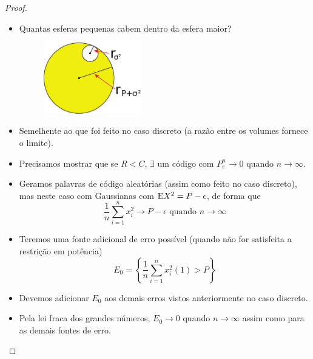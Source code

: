 \begin{frame}[allowframebreaks]
\begin{proof}
  \begin{itemize}
  \item Quantas esferas pequenas cabem dentro da esfera maior?

	\begin{figure}[h!]
	\centering
	\includegraphics[width=0.4\textwidth]{images/spherepack.pdf}
	\label{fig:spherepack}
	\end{figure}

  \item Semelhente ao que foi feito no caso discreto (a razão entre os volumes fornece o limite).
  \end{itemize}

  \proofbreak

  \begin{itemize}
  \item Precisamos mostrar que se $R < C$, $\exists$ um código com $P_e^n \rightarrow 0$ quando $n \rightarrow \infty$.
  \item Geramos palavras de código aleatórias (assim como feito no caso discreto), mas neste caso
	com Gaussianas com $\mathrm{E} X^2 = P - \epsilon$, de forma que
	\begin{equation}
	\frac{1}{n} \sum_{i=1}^{n} x_i^2 \rightarrow P - \epsilon \text{ quando } n \rightarrow \infty
	\end{equation}
  \end{itemize}
  \proofbreak

  \begin{itemize}
  \item Teremos uma fonte adicional de erro possível (quando não for satisfeita a restrição em potência)
	\begin{equation}
	E_0 = \left\{ \frac{1}{n} \sum_{i=1}^{n} x_i^2(1) > P \right\}
	\end{equation}
  \item Devemos adicionar $E_0$ aos demais erros vistos anteriormente no caso discreto.
  \item Pela lei fraca dos grandes números, $E_0 \rightarrow 0$ quando $n \rightarrow \infty$ assim como
	para as demais fontes de erro.
  \end{itemize}

  \end{proof}
\end{frame}



